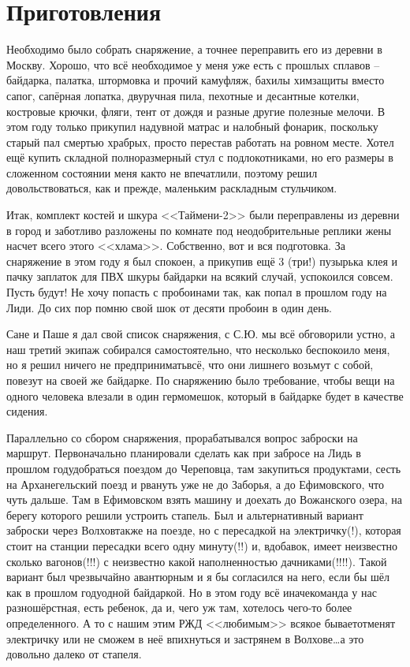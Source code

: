 \chapter{Приготовления} 

Необходимо было собрать снаряжение, а точнее переправить его из деревни в Москву. Хорошо, что всё необходимое у меня уже есть с прошлых сплавов – байдарка, палатка, штормовка и прочий камуфляж, бахилы химзащиты вместо сапог, сапёрная лопатка, двуручная пила, пехотные и десантные котелки, костровые крючки, фляги, тент от дождя и разные другие полезные мелочи. В этом году только прикупил надувной матрас и налобный фонарик, поскольку старый пал смертью храбрых, просто перестав работать на ровном месте. Хотел ещё купить складной полноразмерный стул с подлокотниками, но его размеры в сложенном состоянии меня как\sdash то не впечатлили, поэтому решил довольствоваться, как и прежде, маленьким раскладным стульчиком.

Итак, комплект костей и шкура <<Таймени-2>> были переправлены из деревни в город и заботливо разложены по комнате под неодобрительные реплики жены насчет всего этого <<хлама>>. Собственно, вот и вся подготовка. За снаряжение в этом году я был спокоен, а прикупив ещё 3 (три!) пузырька клея и пачку заплаток для ПВХ шкуры байдарки на всякий случай, успокоился совсем. Пусть будут! Не хочу попасть с пробоинами так, как попал в прошлом году на Лиди. До сих пор помню свой шок от десяти пробоин в один день.

Сане и Паше я дал свой список снаряжения, с С.Ю. мы всё обговорили устно, а наш третий экипаж собирался самостоятельно, что несколько беспокоило меня, но я решил ничего не предпринимать\mdash всё, что они лишнего возьмут с собой, повезут на своей же байдарке. По снаряжению было требование, чтобы вещи на одного человека влезали в один гермомешок, который в байдарке будет в качестве сидения.

Параллельно со сбором снаряжения, прорабатывался вопрос заброски на маршрут. Первоначально планировали сделать как при забросе на Лидь в прошлом году\mdash добраться поездом до Череповца, там закупиться продуктами, сесть на Арханегельский поезд и рвануть уже не до Заборья, а до Ефимовского, что чуть дальше. Там в Ефимовском взять машину и доехать до Вожанского озера, на берегу которого решили устроить стапель. Был и альтернативный вариант заброски через Волхов\mdash также на поезде, но с пересадкой на электричку(!), которая стоит на станции пересадки всего одну минуту(!!) и, вдобавок, имеет неизвестно сколько вагонов(!!!) с неизвестно какой наполненностью дачниками(!!!!). Такой вариант был чрезвычайно авантюрным и я бы согласился на него, если бы шёл как в прошлом году\mdash одной байдаркой. Но в этом году всё иначе\mdash команда у нас разношёрстная, есть ребенок, да и, чего уж там, хотелось чего-то более определенного. А то с нашим этим РЖД <<любимым>> всякое бывает\mdash отменят электричку или не сможем в неё впихнуться и застрянем в Волхове\ldots а это довольно далеко от стапеля.
 
